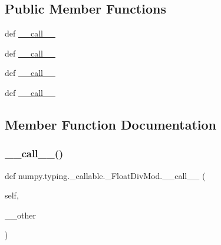 \subsection*{Public Member Functions}
\begin{DoxyCompactItemize}
\item 
def \hyperlink{classnumpy_1_1typing_1_1__callable_1_1__FloatDivMod_a5d8c4ef1bb9b8ec167e40a77f943a27f}{\+\_\+\+\_\+call\+\_\+\+\_\+}
\item 
def \hyperlink{classnumpy_1_1typing_1_1__callable_1_1__FloatDivMod_a5d8c4ef1bb9b8ec167e40a77f943a27f}{\+\_\+\+\_\+call\+\_\+\+\_\+}
\item 
def \hyperlink{classnumpy_1_1typing_1_1__callable_1_1__FloatDivMod_a5d8c4ef1bb9b8ec167e40a77f943a27f}{\+\_\+\+\_\+call\+\_\+\+\_\+}
\item 
def \hyperlink{classnumpy_1_1typing_1_1__callable_1_1__FloatDivMod_a5d8c4ef1bb9b8ec167e40a77f943a27f}{\+\_\+\+\_\+call\+\_\+\+\_\+}
\end{DoxyCompactItemize}


\subsection{Member Function Documentation}
\mbox{\label{classnumpy_1_1typing_1_1__callable_1_1__FloatDivMod_a5d8c4ef1bb9b8ec167e40a77f943a27f}} 
\subsubsection{\texorpdfstring{\+\_\+\+\_\+call\+\_\+\+\_\+()}{\_\_call\_\_()}\hspace{0.1cm}{\footnotesize\ttfamily [1/4]}}
{\footnotesize\ttfamily def numpy.\+typing.\+\_\+callable.\+\_\+\+Float\+Div\+Mod.\+\_\+\+\_\+call\+\_\+\+\_\+ (\begin{DoxyParamCaption}\item[{}]{self,  }\item[{}]{\+\_\+\+\_\+other }\end{DoxyParamCaption})}

